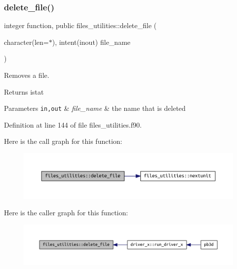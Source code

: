\subsubsection{\texorpdfstring{delete\+\_\+file()}{delete\_file()}}
{\footnotesize\ttfamily integer function, public files\+\_\+utilities\+::delete\+\_\+file (\begin{DoxyParamCaption}\item[{character(len=$\ast$), intent(inout)}]{file\+\_\+name }\end{DoxyParamCaption})}



Removes a file. 

\begin{DoxyReturn}{Returns}
istat
\end{DoxyReturn}

\begin{DoxyParams}[1]{Parameters}
\mbox{\tt in,out}  & {\em file\+\_\+name} & the name that is deleted \\
\hline
\end{DoxyParams}


Definition at line 144 of file files\+\_\+utilities.\+f90.

Here is the call graph for this function\+:\nopagebreak
\begin{figure}[H]
\begin{center}
\leavevmode
\includegraphics[width=350pt]{namespacefiles__utilities_a083c08dfd3919fa2a1df01507fe431af_cgraph}
\end{center}
\end{figure}
Here is the caller graph for this function\+:\nopagebreak
\begin{figure}[H]
\begin{center}
\leavevmode
\includegraphics[width=350pt]{namespacefiles__utilities_a083c08dfd3919fa2a1df01507fe431af_icgraph}
\end{center}
\end{figure}
\mbox{\label{namespacefiles__utilities_a07f2e430ff33c1e291731ad64c1fe482}} 
